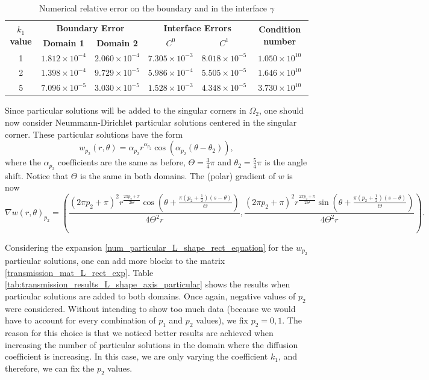 \begin{table}[htbp]
    \centering
    \begin{tabular}{cccccc}
      \toprule
      \multirow{2}{*}{\textbf{\(k_1\) value}} & \multicolumn{2}{c}{\textbf{Boundary Error}} & \multicolumn{2}{c}{\textbf{Interface Errors}} & \multirow{2}{*}{\textbf{Condition number}} \\
      \cmidrule(lr){2-3} \cmidrule(lr){4-5}
      & \textbf{Domain 1} & \textbf{Domain 2} & \textbf{\(C^0\)} & \textbf{\(C^1\)} & \\
      \midrule
      1 & $1.812\times10^{-4}$ & $2.060\times10^{-4}$ & $7.305\times10^{-3}$ & $8.018\times10^{-5}$ & $1.050\times 10^{10}$ \\
      2 & $1.398\times10^{-4}$ & $9.729\times10^{-5}$ & $5.986\times10^{-4}$ & $5.505\times10^{-5}$ & $1.646\times 10^{10}$ \\
      5 & $7.096\times10^{-5}$ & $3.030\times10^{-5}$ & $1.528\times10^{-3}$ & $4.348\times10^{-5}$ & $3.730\times 10^{10}$ \\
      \bottomrule
    \end{tabular}
    \caption{Numerical relative error on the boundary and in the interface \(\gamma\)}
    \label{tab:transmission_results_L_shape_axis}
\end{table}

Since particular solutions will be added to the singular corners in \(\Omega_2\), one should now consider Neummann-Dirichlet particular solutions centered in the singular corner. These particular solutions have the form
\[
    w_{p_2}(r,\theta) = \alpha_{p_2} r^{\alpha_{p_2}}\cos(\alpha_{p_2}(\theta-\theta_2)),
\]
where the \(\alpha_{p_2}\) coefficients are the same as before, \(\Theta = \frac{3}{4}\pi\) and \(\theta_2=\frac{5}{4}\pi\) is the angle shift. Notice that \(\Theta\) is the same in both domains. The (polar) gradient of \(w\) is now
\begin{equation*}
    \nabla w(r,\theta)_{p_2} = \left(\frac{(2 \pi  {p_2}+\pi )^2 r^{\frac{2 \pi  {p_2}+\pi }{2 \Theta }} \cos \left(\theta +\frac{\pi  \left({p_2}+\frac{1}{2}\right) (s-\theta )}{\Theta }\right)}{4 \Theta ^2 r},\frac{(2 \pi  {p_2}+\pi )^2 r^{\frac{2 \pi  {p_2}+\pi }{2 \Theta }} \sin \left(\theta +\frac{\pi  \left({p_2}+\frac{1}{2}\right) (s-\theta )}{\Theta }\right)}{4 \Theta ^2 r}\right).
\end{equation*}

Considering the expansion \eqref{num_particular_L_shape_rect_equation} for the \(w_{p_2}\) particular solutions, one can add more blocks to the matrix \eqref{transmission_mat_L_rect_exp}. Table \ref{tab:transmission_results_L_shape_axis_particular} shows the results when particular solutions are added to both domains. Once again, negative values of \(p_2\) were considered. Without intending to show too much data (because we would have to account for every combination of \(p_1\) and \(p_2\) values), we fix \(p_2=0, 1\). The reason for this choice is that we noticed better results are achieved when increasing the number of particular solutions in the domain where the diffusion coefficient is increasing. In this case, we are only varying the coefficient \(k_1\), and therefore, we can fix the \(p_2\) values.

